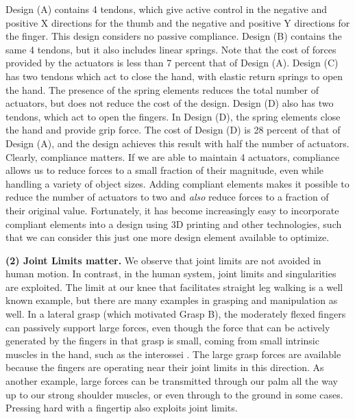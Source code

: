 Design (A) contains 4 tendons, which give active control in the negative and positive X directions for the thumb and the negative and positive Y directions for the finger.   This design considers no passive compliance.   Design (B) contains the same 4 tendons, but it also includes linear springs.   Note that the cost of forces provided by the actuators is less than 7 percent that of Design (A).    Design (C) has two tendons which act to close the hand, with elastic return springs to open the hand.    The presence of the spring elements reduces the total number of actuators, but does not reduce the cost of the design.    Design (D) also has two tendons, which act to open the fingers.    In Design (D), the spring elements close the hand and provide grip force.  The cost of Design (D) is 28 percent of that of Design (A), and the design achieves this result with half the number of actuators.    Clearly, compliance matters.   If we are able to maintain 4 actuators, compliance allows us to reduce forces to a small fraction of their magnitude, even while handling a variety of object sizes.   Adding compliant elements makes it possible to reduce the number of actuators to two and {\it also} reduce forces to a fraction of their original value.  Fortunately, it has become increasingly easy to incorporate compliant elements into a design using 3D printing and other technologies, such that we can consider this just one more design element available to optimize.

\smallskip\noindent
{\bf (2) Joint Limits matter.}   We observe that joint limits are not avoided in human motion.   In contrast, in the human system, joint limits and singularities are exploited.    The limit at our knee that facilitates straight leg walking is a well known example, but there are many examples in grasping and manipulation as well.  In a lateral grasp (which motivated Grasp B), the moderately flexed fingers can passively support large forces, even though the force that can be actively generated by the fingers in that grasp is small, coming from small intrinsic muscles in the hand, such as the interossei \cite{brand1999clinical}.   The large grasp forces are available because the fingers are operating near their joint limits in this direction.   As another example, large forces can be transmitted through our palm all the way up to our strong shoulder muscles, or even through to the ground in some cases.   Pressing hard with a fingertip also exploits joint limits.

